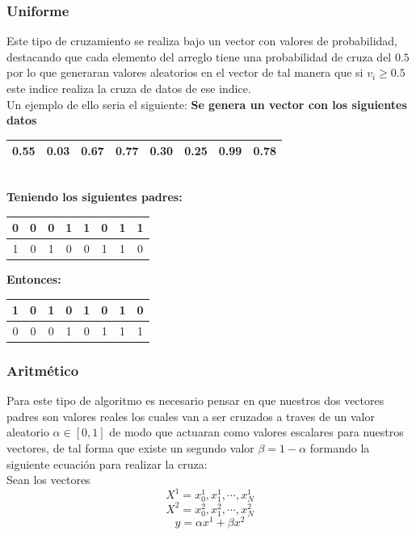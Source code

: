 \documentclass[10pt]{article}
\begin{document}
\subsubsection{Uniforme}
Este tipo de cruzamiento se realiza bajo un vector con valores de probabilidad, destacando que cada elemento del arreglo tiene una probabilidad de cruza del $0.5$ por lo que generaran valores aleatorios en el vector de tal manera que si $v_{i}\geq 0.5$ este indice realiza la cruza de datos de ese indice.\\Un ejemplo de ello seria el siguiente:
\textbf{Se genera un vector con los siguientes datos}
\begin{center}
  \begin{tabular}{|c|c|c|c|c|c|c|c|}
    \hline
    0.55 & 0.03 & 0.67 & 0.77 & 0.30 & 0.25 & 0.99 & 0.78 \\
    \hline
  \end{tabular}
  \\\vspace{0.25cm}
  \textbf{Teniendo los siguientes padres:}\\
  \begin{tabular}{|c|c|c|c|c|c|c|c|}
    \hline
    \color{blue}0&\color{blue}0&\color{blue}0&\color{blue}1&\color{blue}1&\color{blue}0&\color{blue}1&\color{blue}1\\
    \hline
    \color{red}1&\color{red}0&\color{red}1&\color{red}0&\color{red}0&\color{red}1&\color{red}1&\color{red}0\\
    \hline
  \end{tabular}
  \textbf{Entonces:}
  \begin{tabular}{|c|c|c|c|c|c|c|c|}
    \hline
    \color{red}1 & \color{blue}0 & \color{red}1 & \color{red}0  & \color{blue}1 & \color{blue}0 & \color{red}1&\color{red}0\\
    \hline
    \color{blue}0 & \color{red}0 & \color{blue}0 & \color{blue}1  & \color{red}0 & \color{red}1 & \color{blue}1&\color{blue}1\\
    \hline
  \end{tabular}
\end{center}
\subsubsection{Aritmético}
Para este tipo de algoritmo es necesario pensar en que nuestros dos vectores padres son valores reales los cuales van a ser cruzados a traves de un valor aleatorio $\alpha\in[0,1]$ de modo que actuaran como valores escalares para nuestros vectores, de tal forma que existe un segundo valor $\beta=1-\alpha$ formando la siguiente ecuación para realizar la cruza:\\\vspace{0.25cm}
Sean los vectores \\
\[\displaystyle X^{1}={x_0^{1},x_1^{1},\cdots,x_N^{1}}\] \[\displaystyle X^{2}={x_0^{2},x_1^{2},\cdots,x_N^{2}}\]
\[y=\alpha x^{1}+\beta x^{2}\]
\end{document}
